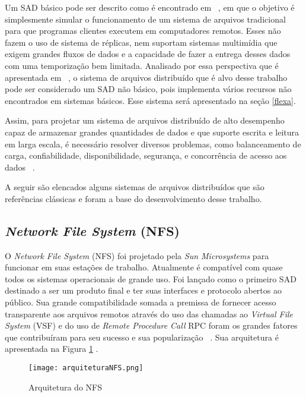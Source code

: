 	 Um SAD básico pode ser descrito como é encontrado em ~\cite{coulouris}, em que o objetivo é simplesmente simular o funcionamento de um sistema de arquivos tradicional para que programas clientes executem em computadores remotos. Esses não fazem o uso de sistema de réplicas, nem suportam sistemas multimídia que exigem grandes fluxos de dados e a capacidade de fazer a entrega desses dados com uma temporização bem limitada.
	 Analisado por essa perspectiva que é apresentada em ~\cite{coulouris}, o sistema de arquivos distribuído que é alvo desse trabalho pode ser considerado um SAD não básico, pois implementa vários recursos não encontrados em sistemas básicos. Esse sistema será apresentado na seção \ref{flexa}.
	 
	Assim, para projetar um sistema de arquivos distribuído de alto desempenho capaz de armazenar grandes quantidades de dados e que suporte escrita e leitura em larga escala, é necessário resolver diversos problemas, como balanceamento de carga, confiabilidade, disponibilidade, segurança, e concorrência de acesso aos dados ~\cite{coulouris}.
	 
	 
	 A seguir são elencados alguns sistemas de arquivos distribuídos que são referências clássicas e foram a base do desenvolvimento desse trabalho.
	


	 
	\subsection{\textit{Network File System} (NFS)}
	
O \textit{Network File System} (NFS) foi projetado pela \textit{Sun Microsystems} para funcionar em suas estações de trabalho. Atualmente é compatível com quase todos os sistemas operacionais de grande uso. Foi lançado como o primeiro SAD destinado a ser um produto final e ter suas interfaces e protocolo abertos ao público. Sua grande compatibilidade somada a premissa de fornecer acesso transparente aos arquivos remotos através do uso das chamadas ao \textit{Virtual File System} (VSF) e do uso de \textit{Remote Procedure Call} RPC foram os grandes fatores que contribuíram para seu sucesso e sua popularização ~\cite{coulouris}. Sua arquitetura é apresentada na Figura \ref{fig:arquiteturaNFS} .
	
    	\begin{figure}[!ht]
            \texttt{[image: arquiteturaNFS.png]}
            \caption{Arquitetura do NFS ~\cite{coulouris}}
            \label{fig:arquiteturaNFS}
        \end{figure}
    
